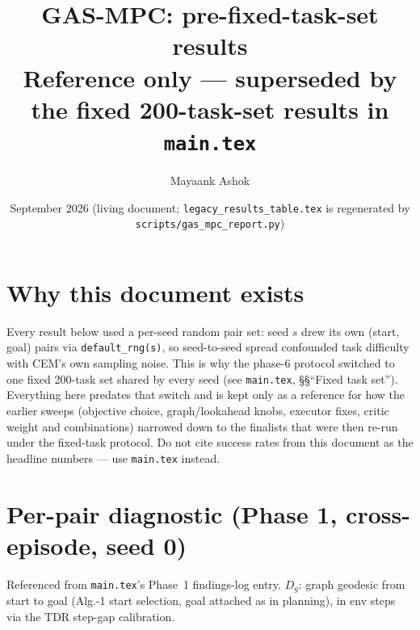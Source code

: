 \documentclass[11pt]{article}
\title{GAS-MPC: pre-fixed-task-set results\\
\large Reference only --- superseded by the fixed 200-task-set results in \texttt{main.tex}}
\author{Mayaank Ashok}
\date{September 2026 (living document; \texttt{legacy\_results\_table.tex} is regenerated by
\texttt{scripts/gas\_mpc\_report.py})}
\begin{document}
\maketitle

\section*{Why this document exists}
Every result below used a per-seed random pair set: seed $s$ drew its own (start, goal)
pairs via \texttt{default\_rng(s)}, so seed-to-seed spread confounded task difficulty with
CEM's own sampling noise. This is why the phase-6 protocol switched to one fixed 200-task
set shared by every seed (see \texttt{main.tex}, \S\S ``Fixed task set''). Everything here
predates that switch and is kept only as a reference for how the earlier sweeps (objective
choice, graph/lookahead knobs, executor fixes, critic weight and combinations) narrowed down
to the finalists that were then re-run under the fixed-task protocol. Do not cite success
rates from this document as the headline numbers --- use \texttt{main.tex} instead.



\section*{Per-pair diagnostic (Phase 1, cross-episode, seed 0)}
Referenced from \texttt{main.tex}'s Phase~1 findings-log entry. $D_g$: graph geodesic from
start to goal (Alg.-1 start selection, goal attached as in planning), in env steps via the
TDR step-gap calibration.


\end{document}
